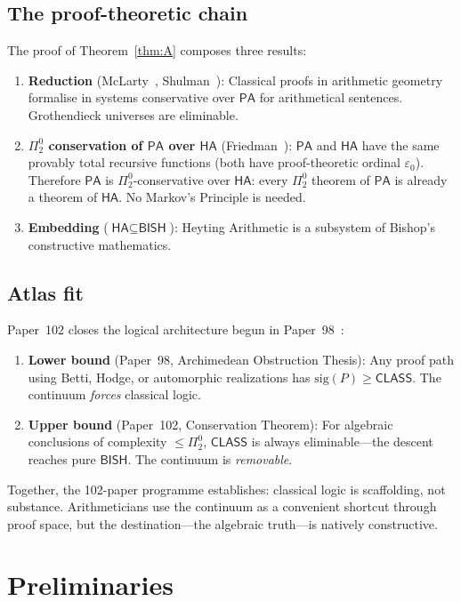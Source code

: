 \documentclass[11pt,a4paper]{article}
\theoremstyle{plain}
\theoremstyle{definition}
\newcommand{\BISH}{\textsf{BISH}}
\newcommand{\CLASS}{\textsf{CLASS}}
\newcommand{\HA}{\textsf{HA}}
\newcommand{\PA}{\textsf{PA}}
\newcommand{\sig}{\mathrm{sig}}
\begin{document}
\subsection{The proof-theoretic chain}

The proof of Theorem~\ref{thm:A} composes three results:
\begin{enumerate}[label=(\roman*)]
\item \textbf{Reduction} (McLarty~\cite{mclarty2010}, Shulman~\cite{shulman2010}): Classical proofs in arithmetic geometry formalise in systems conservative over $\PA$ for arithmetical sentences.  Grothendieck universes are eliminable.
\item \textbf{$\Pi^0_2$ conservation of $\PA$ over $\HA$} (Friedman~\cite{friedman1978}): $\PA$ and $\HA$ have the same provably total recursive functions (both have proof-theoretic ordinal $\varepsilon_0$).  Therefore $\PA$ is $\Pi^0_2$-conservative over $\HA$: every $\Pi^0_2$ theorem of $\PA$ is already a theorem of $\HA$.  No Markov's Principle is needed.
\item \textbf{Embedding} ($\HA \subseteq \BISH$): Heyting Arithmetic is a subsystem of Bishop's constructive mathematics.
\end{enumerate}

\subsection{Atlas fit}

Paper~102 closes the logical architecture begun in Paper~98~\cite{p98}:
\begin{enumerate}[label=(\roman*)]
\item \textbf{Lower bound} (Paper~98, Archimedean Obstruction Thesis): Any proof path using Betti, Hodge, or automorphic realizations has $\sig(P) \ge \CLASS$.  The continuum \emph{forces} classical logic.
\item \textbf{Upper bound} (Paper~102, Conservation Theorem): For algebraic conclusions of complexity $\le \Pi^0_2$, $\CLASS$ is always eliminable---the descent reaches pure $\BISH$.  The continuum is \emph{removable}.
\end{enumerate}
Together, the 102-paper programme establishes: classical logic is scaffolding, not substance.  Arithmeticians use the continuum as a convenient shortcut through proof space, but the destination---the algebraic truth---is natively constructive.


\section{Preliminaries}\label{sec:prelim}
\end{document}
